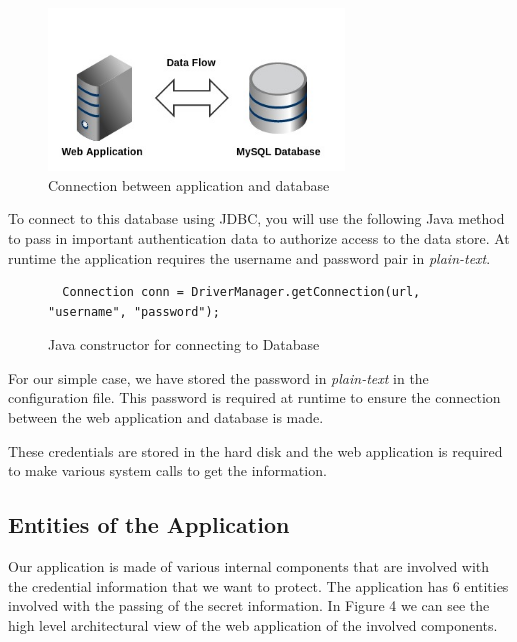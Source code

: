 \documentclass[11pt, a4paper, notitlepage]{article}
\begin{document}
\begin{figure}[h!]
    \centering
    \includegraphics[width=0.7\textwidth]{external-overview.jpg}
    \caption{Connection between application and database}
\end{figure}

To connect to this database using JDBC, you will use the following Java method to pass in important authentication data to authorize access to the data store. At runtime the application requires the username and password pair in \emph{plain-text}. 


\begin{figure}[h!]
\begin{lstlisting}
  Connection conn = DriverManager.getConnection(url, "username", "password");
\end{lstlisting} 
\caption{Java constructor for connecting to Database}
\end{figure}

For our simple case, we have stored the password in \emph{plain-text} in the configuration file. This password is required at runtime to ensure the connection between the web application and database is made. 

These credentials are stored in the hard disk and the web application is required to make various system calls to get the information.

\subsection*{Entities of the Application}
 Our application is made of various internal components that are involved with the credential  information that we want to protect. The application has 6 entities involved with the passing of the secret information. In Figure 4 we can see the high level architectural view of the web application of the involved components. 
\end{document}
